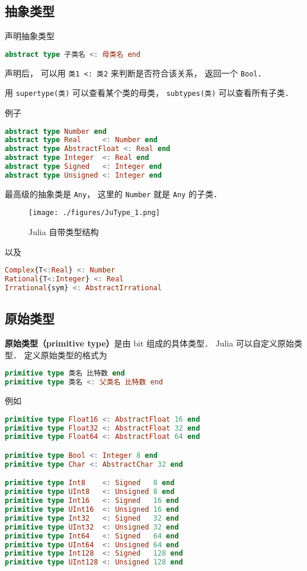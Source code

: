 \subsection{抽象类型}
声明抽象类型
\begin{lstlisting}[language=julia]
abstract type 子类名 <: 母类名 end
\end{lstlisting}
声明后， 可以用 \verb|类1 <: 类2| 来判断是否符合该关系， 返回一个 \verb|Bool|．

用 \verb|supertype(类)| 可以查看某个类的母类， \verb|subtypes(类)| 可以查看所有子类．

例子
\begin{lstlisting}[language=julia]
abstract type Number end
abstract type Real     <: Number end
abstract type AbstractFloat <: Real end
abstract type Integer  <: Real end
abstract type Signed   <: Integer end
abstract type Unsigned <: Integer end
\end{lstlisting}
最高级的抽象类是 \verb|Any|， 这里的 \verb|Number| 就是 \verb|Any| 的子类．

\begin{figure}[ht]
\centering
\texttt{[image: ./figures/JuType\_1.png]}
\caption{Julia 自带类型结构} \label{JuType_fig1}
\end{figure}
以及
\begin{lstlisting}[language=julia]
Complex{T<:Real} <: Number
Rational{T<:Integer} <: Real
Irrational{sym} <: AbstractIrrational
\end{lstlisting}


\subsection{原始类型}
\textbf{原始类型（primitive type）}是由 bit 组成的具体类型． Julia 可以自定义原始类型． 定义原始类型的格式为
\begin{lstlisting}[language=julia]
primitive type 类名 比特数 end
primitive type 类名 <: 父类名 比特数 end
\end{lstlisting}
例如
\begin{lstlisting}[language=julia]
primitive type Float16 <: AbstractFloat 16 end
primitive type Float32 <: AbstractFloat 32 end
primitive type Float64 <: AbstractFloat 64 end

primitive type Bool <: Integer 8 end
primitive type Char <: AbstractChar 32 end

primitive type Int8    <: Signed   8 end
primitive type UInt8   <: Unsigned 8 end
primitive type Int16   <: Signed   16 end
primitive type UInt16  <: Unsigned 16 end
primitive type Int32   <: Signed   32 end
primitive type UInt32  <: Unsigned 32 end
primitive type Int64   <: Signed   64 end
primitive type UInt64  <: Unsigned 64 end
primitive type Int128  <: Signed   128 end
primitive type UInt128 <: Unsigned 128 end
\end{lstlisting}

